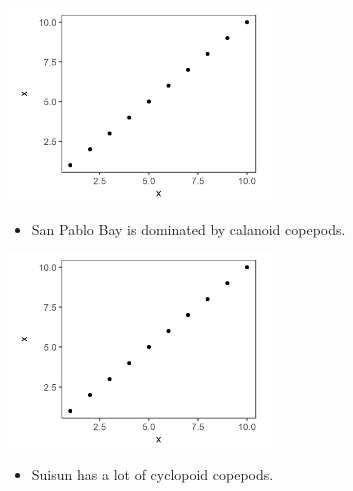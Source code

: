 \documentclass[]{article}\usepackage[]{graphicx}\usepackage[]{color}
\begin{document}

\begin{Row}
  \begin{Cell}{4}
    \begin{center}
      \includegraphics[width=7cm,align=m]{figures/zoop/placeholder_fig.png}
      \begin{itemize}[leftmargin=1.5cm,rightmargin=1cm,topsep=10pt]
        \item San Pablo Bay is dominated by calanoid copepods.
      \end{itemize}
    \end{center}
  \end{Cell}

  \begin{Cell}{4}
    \begin{center}
      \includegraphics[width=7cm,align=m]{figures/zoop/placeholder_fig.png}
      \begin{itemize}[leftmargin=1.5cm,rightmargin=1cm,topsep=10pt]
        \item Suisun has a lot of cyclopoid copepods.
      \end{itemize}
    \end{center}
  \end{Cell}


\end{Row}
\end{document}
